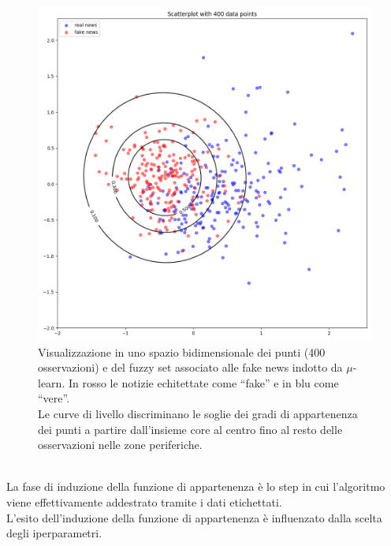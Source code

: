 \documentclass[12pt]{report}
\theoremstyle{definition}
\begin{document}
\begin{figure}
    \centering
    \includegraphics[scale=0.44]{images/mulearn.png}
    \caption{Visualizzazione in uno spazio bidimensionale dei punti (400 osservazioni) e del fuzzy set associato alle fake news indotto da $\mu$-learn. In rosso le notizie echitettate come ``fake'' e in blu come ``vere''.
    \\
    Le curve di livello discriminano le soglie dei gradi di appartenenza dei punti a partire dall'insieme core al centro fino al resto delle osservazioni nelle zone periferiche.}
    \label{mulearnplot}
\end{figure}
\leavevmode\\
La fase di induzione della funzione di appartenenza è lo step in cui l'algoritmo viene effettivamente addestrato tramite i dati etichettati.
\\
L'esito dell'induzione della funzione di appartenenza è influenzato dalla scelta degli iperparametri.
\end{document}
